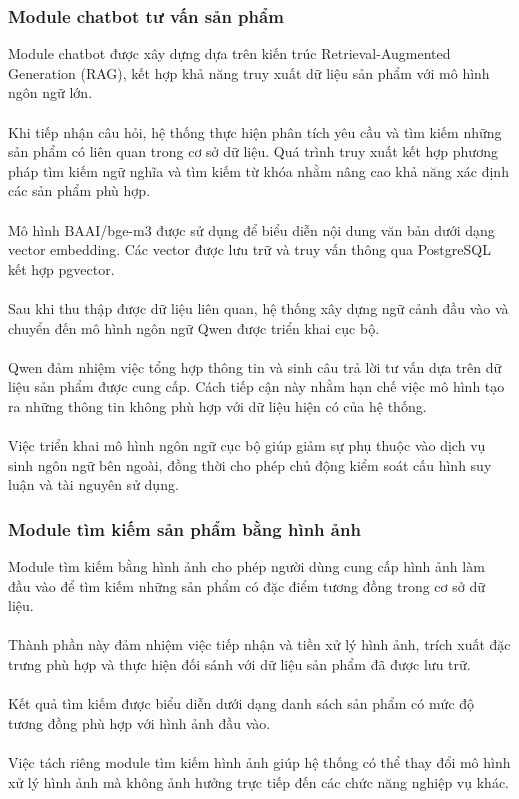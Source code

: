 \documentclass{report}
\begin{document}
\subsubsection{Module chatbot tư vấn sản phẩm}
Module chatbot được xây dựng dựa trên kiến trúc
Retrieval-Augmented Generation (RAG), kết hợp
khả năng truy xuất dữ liệu sản phẩm với mô hình
ngôn ngữ lớn.\\\\
Khi tiếp nhận câu hỏi, hệ thống thực hiện phân
tích yêu cầu và tìm kiếm những sản phẩm có liên
quan trong cơ sở dữ liệu. Quá trình truy xuất
kết hợp phương pháp tìm kiếm ngữ nghĩa và tìm
kiếm từ khóa nhằm nâng cao khả năng xác định
các sản phẩm phù hợp.\\\\
Mô hình BAAI/bge-m3 được sử dụng để biểu diễn
nội dung văn bản dưới dạng vector embedding.
Các vector được lưu trữ và truy vấn thông qua
PostgreSQL kết hợp pgvector.\\\\
Sau khi thu thập được dữ liệu liên quan, hệ
thống xây dựng ngữ cảnh đầu vào và chuyển đến
mô hình ngôn ngữ Qwen được triển khai cục bộ.\\\\
Qwen đảm nhiệm việc tổng hợp thông tin và sinh
câu trả lời tư vấn dựa trên dữ liệu sản phẩm
được cung cấp. Cách tiếp cận này nhằm hạn chế
việc mô hình tạo ra những thông tin không phù
hợp với dữ liệu hiện có của hệ thống.\\\\
Việc triển khai mô hình ngôn ngữ cục bộ giúp
giảm sự phụ thuộc vào dịch vụ sinh ngôn ngữ
bên ngoài, đồng thời cho phép chủ động kiểm
soát cấu hình suy luận và tài nguyên sử dụng.

\subsubsection{Module tìm kiếm sản phẩm bằng hình ảnh}
Module tìm kiếm bằng hình ảnh cho phép người
dùng cung cấp hình ảnh làm đầu vào để tìm kiếm
những sản phẩm có đặc điểm tương đồng trong
cơ sở dữ liệu.\\\\
Thành phần này đảm nhiệm việc tiếp nhận và
tiền xử lý hình ảnh, trích xuất đặc trưng
phù hợp và thực hiện đối sánh với dữ liệu
sản phẩm đã được lưu trữ.\\\\
Kết quả tìm kiếm được biểu diễn dưới dạng
danh sách sản phẩm có mức độ tương đồng
phù hợp với hình ảnh đầu vào.\\\\
Việc tách riêng module tìm kiếm hình ảnh
giúp hệ thống có thể thay đổi mô hình xử
lý hình ảnh mà không ảnh hưởng trực tiếp
đến các chức năng nghiệp vụ khác.
\end{document}
